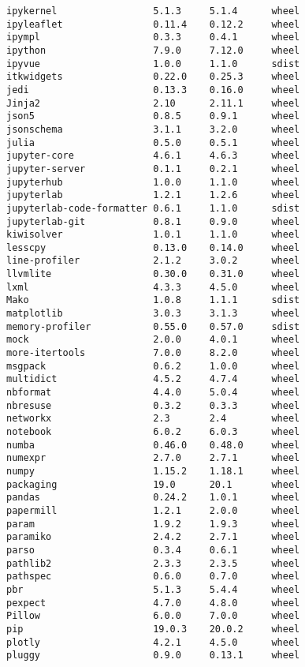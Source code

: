 \documentclass[11pt,a4paper]{article}
\begin{document}
\begin{verbatim}
ipykernel                 5.1.3     5.1.4      wheel
ipyleaflet                0.11.4    0.12.2     wheel
ipympl                    0.3.3     0.4.1      wheel
ipython                   7.9.0     7.12.0     wheel
ipyvue                    1.0.0     1.1.0      sdist
itkwidgets                0.22.0    0.25.3     wheel
jedi                      0.13.3    0.16.0     wheel
Jinja2                    2.10      2.11.1     wheel
json5                     0.8.5     0.9.1      wheel
jsonschema                3.1.1     3.2.0      wheel
julia                     0.5.0     0.5.1      wheel
jupyter-core              4.6.1     4.6.3      wheel
jupyter-server            0.1.1     0.2.1      wheel
jupyterhub                1.0.0     1.1.0      wheel
jupyterlab                1.2.1     1.2.6      wheel
jupyterlab-code-formatter 0.6.1     1.1.0      sdist
jupyterlab-git            0.8.1     0.9.0      wheel
kiwisolver                1.0.1     1.1.0      wheel
lesscpy                   0.13.0    0.14.0     wheel
line-profiler             2.1.2     3.0.2      wheel
llvmlite                  0.30.0    0.31.0     wheel
lxml                      4.3.3     4.5.0      wheel
Mako                      1.0.8     1.1.1      sdist
matplotlib                3.0.3     3.1.3      wheel
memory-profiler           0.55.0    0.57.0     sdist
mock                      2.0.0     4.0.1      wheel
more-itertools            7.0.0     8.2.0      wheel
msgpack                   0.6.2     1.0.0      wheel
multidict                 4.5.2     4.7.4      wheel
nbformat                  4.4.0     5.0.4      wheel
nbresuse                  0.3.2     0.3.3      wheel
networkx                  2.3       2.4        wheel
notebook                  6.0.2     6.0.3      wheel
numba                     0.46.0    0.48.0     wheel
numexpr                   2.7.0     2.7.1      wheel
numpy                     1.15.2    1.18.1     wheel
packaging                 19.0      20.1       wheel
pandas                    0.24.2    1.0.1      wheel
papermill                 1.2.1     2.0.0      wheel
param                     1.9.2     1.9.3      wheel
paramiko                  2.4.2     2.7.1      wheel
parso                     0.3.4     0.6.1      wheel
pathlib2                  2.3.3     2.3.5      wheel
pathspec                  0.6.0     0.7.0      wheel
pbr                       5.1.3     5.4.4      wheel
pexpect                   4.7.0     4.8.0      wheel
Pillow                    6.0.0     7.0.0      wheel
pip                       19.0.3    20.0.2     wheel
plotly                    4.2.1     4.5.0      wheel
pluggy                    0.9.0     0.13.1     wheel

\end{verbatim}
\end{document}
